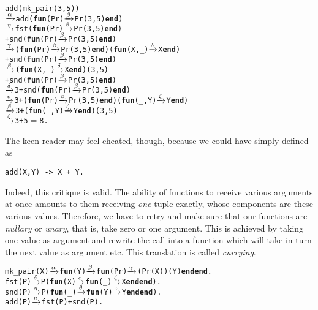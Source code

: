 \begin{alltt}
add(mk\_pair(3,5))
  \(\smashedrightarrow{\alpha}\) add(\textbf{fun}(Pr) \(\smashedrightarrow{\beta}\) Pr(3,5) \textbf{end})
  \(\smashedrightarrow{\eta}\)   fst(\textbf{fun}(Pr) \(\smashedrightarrow{\beta}\) Pr(3,5) \textbf{end})
     + snd(\textbf{fun}(Pr) \(\smashedrightarrow{\beta}\) Pr(3,5) \textbf{end})
  \(\smashedrightarrow{\gamma}\)   (\textbf{fun}(Pr) \(\smashedrightarrow{\beta}\) Pr(3,5) \textbf{end})(\textbf{fun}(X,\_) \(\smashedrightarrow{\delta}\) X \textbf{end})
     + snd(\textbf{fun}(Pr) \(\smashedrightarrow{\beta}\) Pr(3,5) \textbf{end})
  \(\smashedrightarrow{\beta}\)   (\textbf{fun}(X,\_) \(\smashedrightarrow{\delta}\) X \textbf{end})(3,5)
     + snd(\textbf{fun}(Pr) \(\smashedrightarrow{\beta}\) Pr(3,5) \textbf{end})
  \(\smashedrightarrow{\delta}\) 3 + snd(\textbf{fun}(Pr) \(\smashedrightarrow{\beta}\) Pr(3,5) \textbf{end})
  \(\smashedrightarrow{\epsilon}\) 3 + (\textbf{fun}(Pr) \(\smashedrightarrow{\beta}\) Pr(3,5) \textbf{end})(\textbf{fun}(\_,Y) \(\smashedrightarrow{\zeta}\) Y \textbf{end})
  \(\smashedrightarrow{\beta}\) 3 + (\textbf{fun}(\_,Y) \(\smashedrightarrow{\zeta}\) Y \textbf{end})(3,5)
  \(\smashedrightarrow{\zeta}\) 3 + 5 \(=\) 8.
\end{alltt}
The keen reader may feel cheated, though, because we could have simply
defined  as
\begin{verbatim}
add(X,Y) -> X + Y.
\end{verbatim}
Indeed, this critique is valid. The ability of functions to receive
various arguments at once amounts to them receiving \emph{one} tuple
exactly, whose components are these various values. Therefore, we have
to retry and make sure that our functions are \emph{nullary} or
\emph{unary}, that is, take zero or one argument. This is achieved by
taking one value as argument and rewrite the call into a function
which will take in turn the next value as argument etc. This
translation is called \emph{currying}.
\begin{alltt}
mk\_pair(X) \(\smashedrightarrow{\alpha}\) \textbf{fun}(Y) \(\smashedrightarrow{\beta}\) \textbf{fun}(Pr) \(\smashedrightarrow{\gamma}\) (Pr(X))(Y) \textbf{end} \textbf{end}.
fst(P) \(\smashedrightarrow{\delta}\) P(\textbf{fun}(X) \(\smashedrightarrow{\epsilon}\) \textbf{fun}(\_) \(\smashedrightarrow{\zeta}\) X \textbf{end} \textbf{end}).
snd(P) \(\smashedrightarrow{\eta}\) P(\textbf{fun}(\_) \(\smashedrightarrow{\theta}\) \textbf{fun}(Y) \(\smashedrightarrow{\iota}\) Y \textbf{end} \textbf{end}).
add(P) \(\smashedrightarrow{\kappa}\) fst(P) + snd(P).
\end{alltt}
